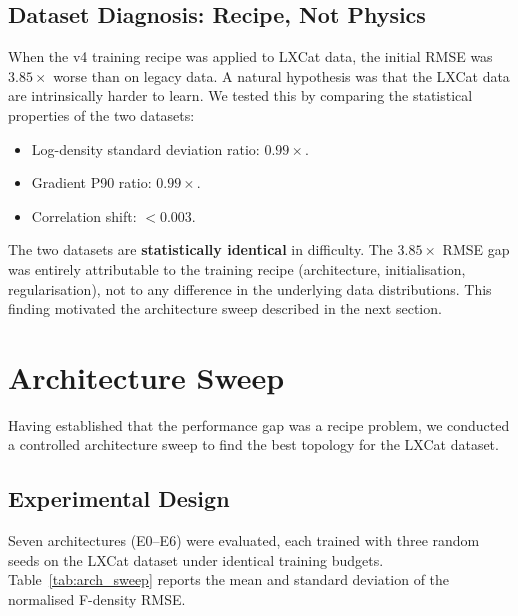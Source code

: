 \documentclass[12pt,a4paper]{article}
\begin{document}
\subsection{Dataset Diagnosis: Recipe, Not Physics}
\label{sec:dataset_diagnosis}

When the v4 training recipe was applied to LXCat data, the initial
RMSE was $3.85\times$ worse than on legacy data.  A natural hypothesis
was that the LXCat data are intrinsically harder to learn.  We tested
this by comparing the statistical properties of the two datasets:
\begin{itemize}
  \item Log-density standard deviation ratio: $0.99\times$.
  \item Gradient P90 ratio: $0.99\times$.
  \item Correlation shift: $< 0.003$.
\end{itemize}
The two datasets are \textbf{statistically identical} in difficulty.
The $3.85\times$ RMSE gap was entirely attributable to the training
recipe (architecture, initialisation, regularisation), not to any
difference in the underlying data distributions.  This finding
motivated the architecture sweep described in the next section.

\section{Architecture Sweep}
\label{sec:arch_sweep}

Having established that the performance gap was a recipe problem, we
conducted a controlled architecture sweep to find the best topology
for the LXCat dataset.

\subsection{Experimental Design}

Seven architectures (E0--E6) were evaluated, each trained with three
random seeds on the LXCat dataset under identical training budgets.
Table~\ref{tab:arch_sweep} reports the mean and standard deviation
of the normalised F-density RMSE.
\end{document}
